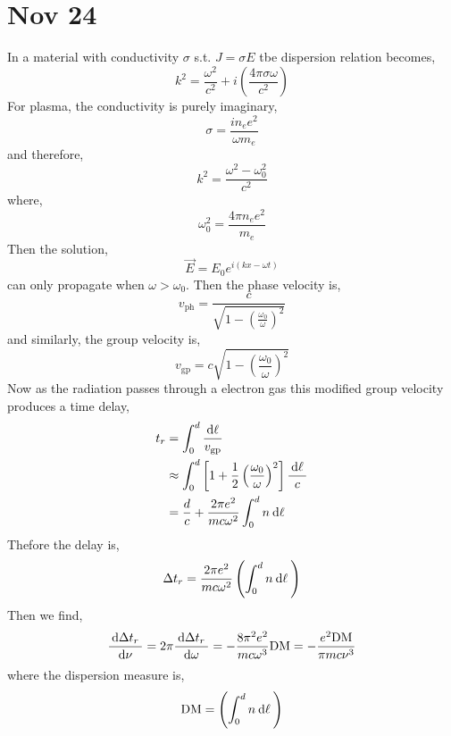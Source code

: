 \documentclass[11pt, a4paper]{article}
\begin{document}
\section{Nov 24}

In a material with conductivity $\sigma$ s.t. $J = \sigma E$ tbe dispersion relation becomes,
\[ k^2 = \frac{\omega^2}{c^2} + i \left( \frac{4 \pi \sigma \omega}{c^2} \right) \]
For plasma, the conductivity is purely imaginary,
\[ \sigma = \frac{i n_e e^2}{\omega m_e} \]
and therefore,
\[ k^2 = \frac{\omega^2 - \omega_0^2}{c^2} \]
where,
\[ \omega_0^2 = \frac{4 \pi n_e e^2}{m_e} \]
Then the solution,
\[ \vec{E} = E_0 e^{i (kx - \omega t)} \]
can only propagate when $\omega  > \omega_0$. Then the phase velocity is,
\[ v_{\text{ph}} = \frac{c}{\sqrt{1 - \left( \frac{\omega_0}{\omega} \right)^2}} \]
and similarly, the group velocity is,
\[ v_{\text{gp}} = c \sqrt{1 - \left( \frac{\omega_0}{\omega} \right)^2} \]
Now as the radiation passes through a electron gas this modified group velocity produces a time delay,
\begin{align*}
t_r & = \int_0^d \frac{\: \mathrm{d}\ell \:}{v_{\text{gp}}} 
\\
& \approx \int_0^d \left[ 1 + \frac{1}{2} \left( \frac{\omega_0}{\omega} \right)^2 \right] \frac{\: \mathrm{d}\ell \:}{c}
\\
& = \frac{d}{c} + \frac{2 \pi e^2}{m c \omega^2} \int_0^d n \: \mathrm{d}\ell \: 
\end{align*}
Thefore the delay is,
\[ \Delta t_r =  \frac{2 \pi e^2}{m c \omega^2} \left( \int_0^d n \: \mathrm{d}\ell \: \right) \]
Then we find,
\[ \frac{\: \mathrm{d}\Delta t_r \:}{\: \mathrm{d}\nu \:} = 2 \pi \frac{\: \mathrm{d}\Delta t_r \:}{\: \mathrm{d}\omega \:} = - \frac{8 \pi^2 e^2}{m c \omega^3} \mathrm{DM} = - \frac{e^2 \mathrm{DM}}{\pi m c \nu^3}  \]
where the dispersion measure is,
\[ \mathrm{DM} = \left( \int_0^d n \: \mathrm{d}\ell \: \right) \]
\end{document}
